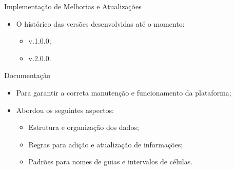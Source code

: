 \begin{frame}{Implementação de Melhorias e Atualizações}
    \begin{itemize}
        \item O histórico das versões desenvolvidas até o momento: \vspace{0.5cm}
              \begin{itemize}
                  \item v.1.0.0; \vspace{0.5cm}
                  \item v.2.0.0. \vspace{0.5cm}
              \end{itemize}
    \end{itemize}
\end{frame}

\begin{frame}{Documentação}
    \begin{itemize}
        \item Para garantir a correta manutenção e funcionamento da plataforma; \vspace{0.5cm}
        \item Abordou os seguintes aspectos: \vspace{0.5cm}
              \begin{itemize}
                  \item Estrutura e organização dos dados; \vspace{0.5cm}
                  \item Regras para adição e atualização de informações; \vspace{0.5cm}
                  \item Padrões para nomes de guias e intervalos de células.
              \end{itemize}
    \end{itemize}
\end{frame}